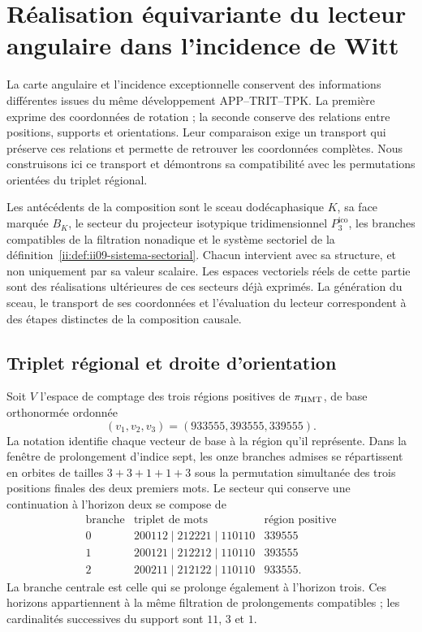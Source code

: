 \section{Réalisation équivariante du lecteur angulaire dans l’incidence de Witt}
\label{ii:sec:ii-enlace-angular-witt}

La carte angulaire et l’incidence exceptionnelle conservent des informations différentes issues du même développement APP--TRIT--TPK. La première exprime des coordonnées de rotation ; la seconde conserve des relations entre positions, supports et orientations. Leur comparaison exige un transport qui préserve ces relations et permette de retrouver les coordonnées complètes. Nous construisons ici ce transport et démontrons sa compatibilité avec les permutations orientées du triplet régional.

Les antécédents de la composition sont le sceau dodécaphasique \(K\), sa face marquée \(B_K\), le secteur du projecteur isotypique tridimensionnel \(P_3^{\mathrm{ico}}\), les branches compatibles de la filtration nonadique et le système sectoriel de la définition~\ref{ii:def:ii09-sistema-sectorial}. Chacun intervient avec sa structure, et non uniquement par sa valeur scalaire. Les espaces vectoriels réels de cette partie sont des réalisations ultérieures de ces secteurs déjà exprimés. La génération du sceau, le transport de ses coordonnées et l’évaluation du lecteur correspondent à des étapes distinctes de la composition causale.

\subsection{Triplet régional et droite d’orientation}

Soit \(V\) l’espace de comptage des trois régions positives de
\(\pi_{\rm HMT}\), de base orthonormée ordonnée
\[
 (v_1,v_2,v_3)=(933555,393555,339555).
\]
La notation identifie chaque vecteur de base à la région qu’il représente.
Dans la fenêtre de prolongement d’indice sept, les onze branches admises
se répartissent en orbites de tailles \(3+3+1+1+3\) sous la permutation
simultanée des trois positions finales des deux premiers mots.
Le secteur qui conserve une continuation à l’horizon deux se compose de
\[
\begin{array}{c|c|c}
\text{branche}&\text{triplet de mots}&\text{région positive}\\ \hline
0&200112\mid212221\mid110110&339555\\
1&200121\mid212212\mid110110&393555\\
2&200211\mid212122\mid110110&933555.
\end{array}
\]
La branche centrale est celle qui se prolonge également à l’horizon trois. Ces
horizons appartiennent à la même filtration de prolongements compatibles ;
les cardinalités successives du support sont \(11\), \(3\) et \(1\).

